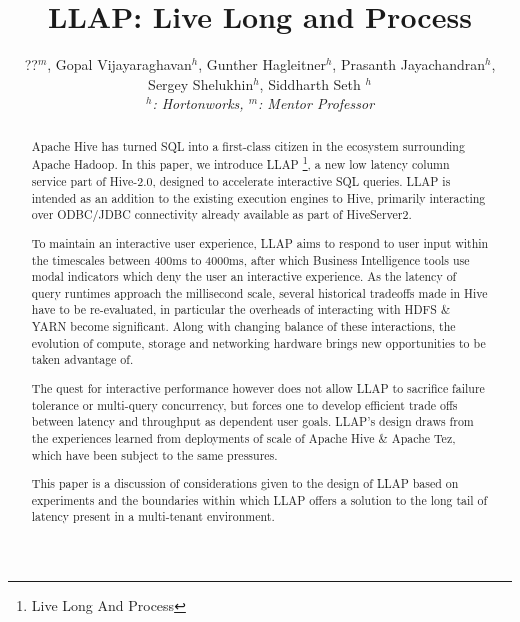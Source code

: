 \documentclass{vldb}
\begin{document}
\title{LLAP: Live Long and Process}

\author{
\alignauthor
??$^m$, Gopal Vijayaraghavan$^h$, Gunther Hagleitner$^h$, Prasanth Jayachandran$^h$, \\ 
Sergey Shelukhin$^h$, Siddharth Seth $^h$
\\
{\large \emph{$^h$: Hortonworks, $^m$: Mentor Professor}}
}

\maketitle

\begin{abstract}
Apache Hive has turned SQL into a first-class citizen in the ecosystem surrounding Apache Hadoop.
In this paper, we introduce LLAP \footnote{Live Long And Process}, a new low latency column service 
part of Hive-2.0, designed to accelerate interactive SQL queries. LLAP is intended as an addition
to the existing execution engines to Hive, primarily interacting over ODBC/JDBC connectivity already
available as part of HiveServer2.

To maintain an interactive user experience, LLAP aims to respond to user input within the timescales
between 400ms to 4000ms, after which Business Intelligence tools use modal indicators which deny the 
user an interactive experience. As the latency of query runtimes approach the millisecond scale, 
several historical tradeoffs made in Hive have to be re-evaluated, in particular the overheads of
interacting with HDFS \& YARN become significant. Along with changing balance of these interactions, 
the evolution of compute, storage and networking hardware brings new opportunities to be taken
advantage of.

The quest for interactive performance however does not allow LLAP to sacrifice failure tolerance or 
multi-query concurrency, but forces one to develop efficient trade offs between latency and throughput 
as dependent user goals. LLAP's design draws from the experiences learned from deployments of scale of 
Apache Hive \& Apache Tez, which have been subject to the same pressures.


This paper is a discussion of considerations given to the design of LLAP based on experiments and the
boundaries within which LLAP offers a solution to the long tail of latency present in a multi-tenant
environment.

\end{abstract}
\end{document}
